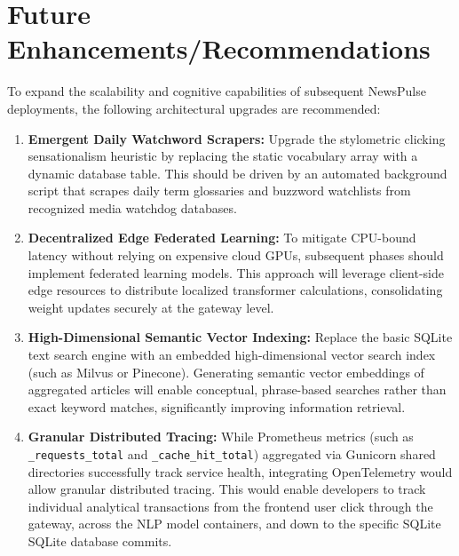 \section{Future Enhancements/Recommendations}
To expand the scalability and cognitive capabilities of subsequent NewsPulse deployments, the following architectural upgrades are recommended:
\begin{enumerate}
    \item \textbf{Emergent Daily Watchword Scrapers:} Upgrade the stylometric clicking sensationalism heuristic by replacing the static vocabulary array with a dynamic database table. This should be driven by an automated background script that scrapes daily term glossaries and buzzword watchlists from recognized media watchdog databases.
    \item \textbf{Decentralized Edge Federated Learning:} To mitigate CPU-bound latency without relying on expensive cloud GPUs, subsequent phases should implement federated learning models. This approach will leverage client-side edge resources to distribute localized transformer calculations, consolidating weight updates securely at the gateway level.
    \item \textbf{High-Dimensional Semantic Vector Indexing:} Replace the basic SQLite text search engine with an embedded high-dimensional vector search index (such as Milvus or Pinecone). Generating semantic vector embeddings of aggregated articles will enable conceptual, phrase-based searches rather than exact keyword matches, significantly improving information retrieval.
    \item \textbf{Granular Distributed Tracing:} While Prometheus metrics (such as \texttt{\_requests\_total} and \texttt{\_cache\_hit\_total}) aggregated via Gunicorn shared directories successfully track service health, integrating OpenTelemetry would allow granular distributed tracing. This would enable developers to track individual analytical transactions from the frontend user click through the gateway, across the NLP model containers, and down to the specific SQLite SQLite database commits.
\end{enumerate}
